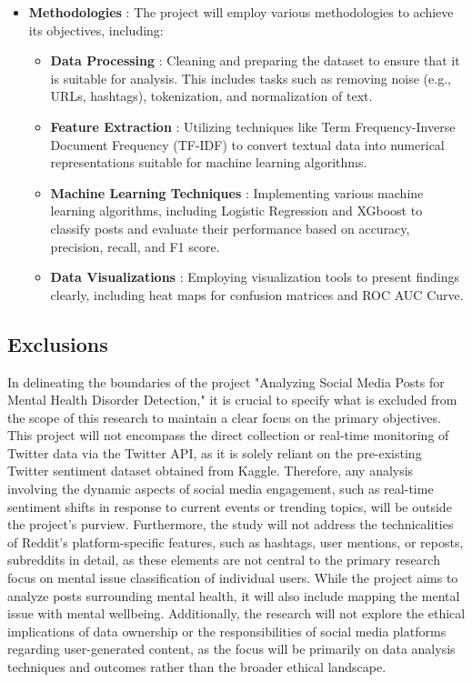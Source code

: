 \begin{itemize}
    \item \textbf{Methodologies} :
    \noindent
    The project will employ various methodologies to achieve its objectives, including:
    \begin{itemize}
        \item \textbf{Data Processing} :
        \noindent
        Cleaning and preparing the dataset to ensure that it is suitable for analysis. This includes tasks such as removing noise (e.g., URLs, hashtags), tokenization, and normalization of text.
        \item \textbf{Feature Extraction} :
        \noindent
        Utilizing techniques like Term Frequency-Inverse Document Frequency (TF-IDF) to convert textual data into numerical representations suitable for machine learning algorithms.
        \item \textbf{Machine Learning Techniques} :
        \noindent
        Implementing various machine learning algorithms, including Logistic Regression and XGboost to classify posts and evaluate their performance based on accuracy, precision, recall, and F1 score.
        \item \textbf{Data Visualizations} :
        \noindent
        Employing visualization tools to present findings clearly, including heat maps for confusion matrices and ROC AUC Curve.
    \end{itemize}
\end{itemize}

\subsection{Exclusions}
\noindent
In delineating the boundaries of the project "Analyzing Social Media Posts for Mental Health Disorder Detection," it is crucial to specify what is excluded from the scope of this research to maintain a clear focus on the primary objectives. This project will not encompass the direct collection or real-time monitoring of Twitter data via the Twitter API, as it is solely reliant on the pre-existing Twitter sentiment dataset obtained from Kaggle. Therefore, any analysis involving the dynamic aspects of social media engagement, such as real-time sentiment shifts in response to current events or trending topics, will be outside the project's purview. Furthermore, the study will not address the technicalities of Reddit’s platform-specific features, such as hashtags, user mentions, or reposts, subreddits in detail, as these elements are not central to the primary research focus on mental issue classification of individual users. While the project aims to analyze posts surrounding mental health, it will also include mapping the mental issue with mental wellbeing. Additionally, the research will not explore the ethical implications of data ownership or the responsibilities of social media platforms regarding user-generated content, as the focus will be primarily on data analysis techniques and outcomes rather than the broader ethical landscape.

